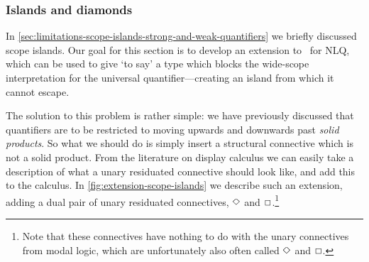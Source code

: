 \subsubsection{Islands and diamonds}
\label{sec:scope-islands}
In \autoref{sec:limitations-scope-islands-strong-and-weak-quantifiers}
we briefly discussed scope islands. Our goal for this section is to
develop an extension to \I\B\C\ for NLQ,  which can be used to give
`to say' a type which blocks the wide-scope interpretation for the
universal quantifier---creating an island from which it cannot escape.

The solution to this problem is rather simple: we have previously
discussed that quantifiers are to be restricted to moving upwards and
downwards past \emph{solid products}. So what we should do is simply
insert a structural connective which is not a solid product.
From the literature on display calculus we can easily take a
description of what a unary residuated connective should look like,
and add this to the calculus. In \autoref{fig:extension-scope-islands}
we describe such an extension, adding a dual pair of unary residuated
connectives, $\Diamond$ and $\Box$.\footnote{%
  Note that these connectives have nothing to do with the unary
  connectives from modal logic, which are unfortunately also often
  called $\Diamond$ and $\Box$.
}



